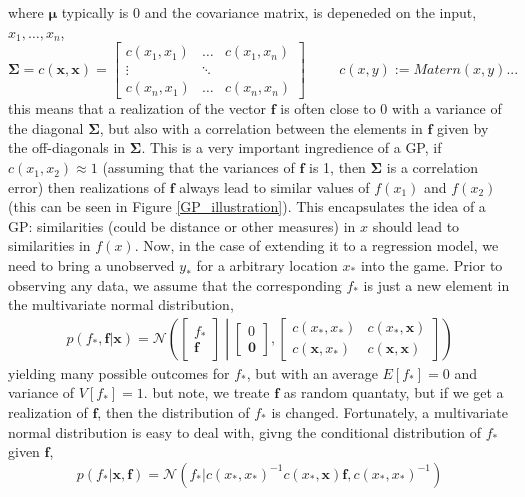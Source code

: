 where $\bm{\mu}$ typically is $0$ and the covariance matrix, is depeneded on the input, $x_1, \dots, x_n$, 
 $$\bm{\Sigma} = c(\textbf{x}, \textbf{x}) = \begin{bmatrix}
    c(x_1,x_1) & \dots & c(x_1,x_n)\\
    \vdots& \ddots\\
    c(x_n,x_1) & \dots & c(x_n,x_n) \end{bmatrix}\hspace{1cm} c(x, y) := Matern(x,y)...$$ this means
that a realization of the vector $\textbf{f}$ is often close to 0 with a variance of the diagonal
$\bm{\Sigma}$, but also with a correlation between the elements in $\textbf{f}$
given by the off-diagonals in $\bm{\Sigma}$. This is a very important ingredience of a GP, if
$c(x_1,x_2) \approx 1$ (assuming that the variances of $\textbf{f}$ is 1, then $\bm{\Sigma}$ is a
correlation error) then realizations of $\textbf{f}$ always lead to similar values of $f(x_1)$ and
$f(x_2)$ (this can be seen in Figure \ref{GP_illustration}). This encapsulates the idea of a GP: similarities
(could be distance or other measures) in $x$ should lead to similarities in $f(x)$. Now, in the case
of extending it to a regression model, we need to bring a unobserved $y_*$ for a arbitrary location
$x_*$ into the game. Prior to observing any data, we assume that the corresponding $f_*$ is
just a new element in the multivariate normal distribution, 
\begin{align}
    p(f_*,\textbf{f}|\textbf{x}) = \mathcal{N}\left(\begin{bmatrix}
        f_*\\ \textbf{f}
    \end{bmatrix} \middle| \begin{bmatrix}
        0\\ \textbf{0}
    \end{bmatrix}, \begin{bmatrix}
        c(x_*, x_*) & c(x_*,\textbf{x})\\
        c(\textbf{x}, x_*) & c(\textbf{x}, \textbf{x})
    \end{bmatrix} \right)
\end{align}
yielding many possible outcomes for $f_*$, but with an average $E[f_*] = 0$ and variance of $V[f_*] = 1$.
but note, we treate $\textbf{f}$ as random quantaty, but if we get a realization of $\textbf{f}$, then
the distribution of $f_*$ is changed. Fortunately, a multivariate normal distribution is easy
to deal with, givng the conditional distribution of $f_*$ given $\textbf{f}$, 
$$p(f_*|\textbf{x}, \textbf{f}) = \mathcal{N}(f_*|c(x_*, x_*)^{-1}c(x_*, \textbf{x})\textbf{f}, c(x_*, x_*)^{-1})$$

